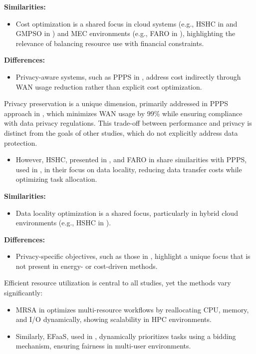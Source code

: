 \documentclass[a4paper, final]{article}
\begin{document}
\noindent \textbf{Similarities:}
\begin{itemize}
    \item Cost optimization is a shared focus in cloud systems (e.g., HSHC in \cite{bib:9} and GMPSO in \cite{bib:10})
    and MEC environments (e.g., FARO in \cite{bib:2_faro}), highlighting the relevance of balancing resource use with financial 
    constraints.
\end{itemize}

\noindent \textbf{Differences:}
\begin{itemize}
    \item Privacy-aware systems, such as PPPS in \cite{bib:7_ppps}, address cost indirectly 
    through WAN usage reduction rather than explicit cost optimization.
\end{itemize}

Privacy preservation is a unique dimension, primarily addressed in PPPS approach in \cite{bib:7_ppps}, 
which minimizes WAN usage by 99\% while ensuring compliance with data privacy regulations. This 
trade-off between performance and privacy is distinct from the goals of other studies, which do not 
explicitly address data protection.
\begin{itemize}
    \item However, HSHC, presented in \cite{bib:9}, and FARO in \cite{bib:2_faro} share similarities 
    with PPPS, used in \cite{bib:7_ppps}, in their focus on data locality, reducing data transfer costs while 
    optimizing task allocation.
\end{itemize}

\noindent \textbf{Similarities:}
\begin{itemize}
    \item Data locality optimization is a shared focus, particularly in hybrid cloud environments 
    (e.g., HSHC in \cite{bib:9}).
\end{itemize}

\noindent \textbf{Differences:}
\begin{itemize}
    \item Privacy-specific objectives, such as those in \cite{bib:7_ppps}, highlight a unique focus that is not 
    present in energy- or cost-driven methods.
\end{itemize}

Efficient resource utilization is central to all studies, yet the methods vary significantly:
\begin{itemize}
    \item MRSA in \cite{bib:8} optimizes multi-resource workflows by reallocating CPU, memory, 
    and I/O dynamically, showing scalability in HPC environments.
    \item Similarly, EFaaS, used in \cite{bib:4_faas}, dynamically prioritizes tasks using a 
    bidding mechanism, ensuring fairness in multi-user environments.
\end{itemize}
\end{document}
